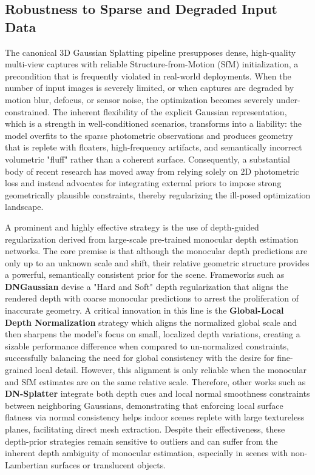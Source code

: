 \documentclass[11pt,a4paper]{article}
\begin{document}
\subsection{Robustness to Sparse and Degraded Input Data}


The canonical 3D Gaussian Splatting pipeline presupposes dense, high-quality multi-view captures with reliable Structure-from-Motion (SfM) initialization, a precondition that is frequently violated in real-world deployments. When the number of input images is severely limited, or when captures are degraded by motion blur, defocus, or sensor noise, the optimization becomes severely under-constrained. The inherent flexibility of the explicit Gaussian representation, which is a strength in well-conditioned scenarios, transforms into a liability: the model overfits to the sparse photometric observations and produces geometry that is replete with floaters, high-frequency artifacts, and semantically incorrect volumetric "fluff" rather than a coherent surface. Consequently, a substantial body of recent research has moved away from relying solely on 2D photometric loss and instead advocates for integrating external priors to impose strong geometrically plausible constraints, thereby regularizing the ill-posed optimization landscape.

A prominent and highly effective strategy is the use of depth-guided regularization derived from large-scale pre-trained monocular depth estimation networks. The core premise is that although the monocular depth predictions are only up to an unknown scale and shift, their relative geometric structure provides a powerful, semantically consistent prior for the scene. Frameworks such as \textbf{DNGaussian} \cite{arxiv:2403.06912v3} devise a "Hard and Soft" depth regularization that aligns the rendered depth with coarse monocular predictions to arrest the proliferation of inaccurate geometry. A critical innovation in this line is the \textbf{Global-Local Depth Normalization} strategy which aligns the normalized global scale and then sharpens the model's focus on small, localized depth variations, creating a sizable performance difference when compared to un-normalized constraints, successfully balancing the need for global consistency with the desire for fine-grained local detail. However, this alignment is only reliable when the monocular and SfM estimates are on the same relative scale. Therefore, other works such as \textbf{DN-Splatter} \cite{arxiv:2403.17822v1} integrate both depth cues and local normal smoothness constraints between neighboring Gaussians, demonstrating that enforcing local surface flatness via normal consistency helps indoor scenes replete with large textureless planes, facilitating direct mesh extraction. Despite their effectiveness, these depth-prior strategies remain sensitive to outliers and can suffer from the inherent depth ambiguity of monocular estimation, especially in scenes with non-Lambertian surfaces or translucent objects.
\end{document}
